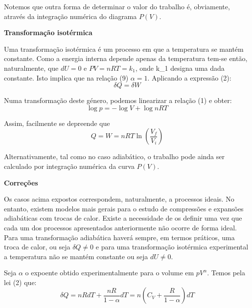 \documentclass[9pt]{extarticle}
\begin{document}
\begin{multicols}{2}
\par Notemos que outra forma de determinar o valor do trabalho é, obviamente, através da integração numérica do diagrama $P(V)$.
\vspace{2mm}
\par \textbf{Transformação isotérmica}

\par Uma transformação isotérmica é um processo em que a temperatura se mantém constante. Como a energia interna depende apenas da temperatura tem-se então, naturalmente, que $d U = 0$ e $PV=nRT=k_1$, onde k_1 designa uma dada constante. Isto implica que na relação (9) $\alpha = 1$. Aplicando a expressão (2):
\begin{equation}
\delta Q = \delta W 
\end{equation}

\par Numa transformação deste género, podemos linearizar a relação (1) e obter:
\begin{equation}
\log p = -\log V + \log nRT
\end{equation}

\par Assim, facilmente se depreende que
\begin{equation}
Q = W = nRT \ln \left(\frac{V_f}{V_i} \right)
\end{equation}

\par Alternativamente, tal como no caso adiabático, o trabalho pode ainda ser calculado por integração numérica da curva $P(V)$.

\par \textbf{Correções}

\par Os casos acima expostos correspondem, naturalmente, a processos ideais. No entanto, existem modelos mais gerais para o estudo de compressões e expansões adiabáticas com trocas de calor. Existe a necessidade de os definir uma vez que cada um dos processos apresentados anteriormente não ocorre de forma ideal. Para uma transformação adiabática haverá sempre, em termos práticos, uma troca de calor, ou seja $\delta Q \neq 0$ e para uma transformação isotérmica experimental a temperatura não se mantém constante ou seja $dU \neq 0$. 

\par Seja $\alpha$ o expoente obtido experimentalmente para o volume em $pV^{\alpha}$. Temos pela lei (2) que:
\begin{equation}
\delta Q = nRdT + \frac{nR}{1-\alpha}dT = n (C_V + \frac{R}{1-\alpha}) dT
\end{equation}


\end{multicols}
\end{document}
